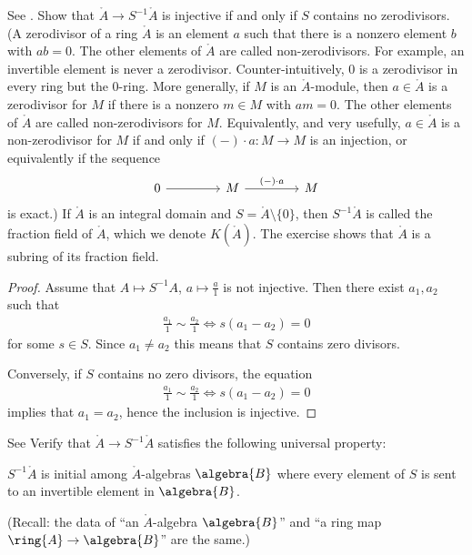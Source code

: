 \begin{exercise}
  See \cite[Exercise 1.3.C]{vakil2024the-rising-sea}.
  Show that $\ring{A}\rightarrow S^{-1}\ring{A}$ is injective if and only if $S$ contains no
  zerodivisors. (A zerodivisor of a ring $\ring{A}$ is an element $a$ such that
  there is a nonzero element $b$ with $ab = 0$. The other elements of $\ring{A}$
  are called non-zerodivisors. For example, an invertible element is
  never a zerodivisor. Counter-intuitively, $0$ is a zerodivisor in
  every ring but the $0$-ring. More generally, if $M$ is an $\ring{A}$-module, then
  $a\in \ring{A}$ is a zerodivisor for $M$ if there is a nonzero $m \in M$ with $am =
  0$. The other elements of $\ring{A}$ are called non-zerodivisors for
  $M$. Equivalently, and very usefully, $a\in \ring{A}$ is a non-zerodivisor for $M$
  if and only if $(-)\cdot a \colon M\rightarrow  M$ is an injection,
  or equivalently if the sequence
    \begin{equation}
      \begin{tikzcd}[nodes in empty cells, column sep= 1.5cm, row sep=1.5cm]
        0 \ar[r] & M \ar[r, "(-)\cdot a "] & M 
      \end{tikzcd}
    \end{equation}
  is exact.) If $\ring{A}$ is an integral
  domain and $S = \ring{A}\setminus \{0\}$, then $S^{-1}\ring{A}$ is called the fraction field of $\ring{A}$,
  which we denote $K(\ring{A})$. The exercise shows that $\ring{A}$ is
  a subring of its fraction field.
\end{exercise}

\begin{proof}
  Assume that $A\mapsto S^{-1}A$, $a \mapsto \frac{a}{1}$ is not
  injective. Then there exist $a_1,a_2$ such that
  \begin{align*}
    \frac{a_1}{1}\sim \frac{a_2}{1} \Leftrightarrow s(a_1 - a_2) = 0
  \end{align*}
  for some $s\in S$. Since $a_1 \neq a_2 $ this means that $S$
  contains zero divisors.

  Conversely, if $S$ contains no zero divisors, the equation
  \begin{align*}
    \frac{a_1}{1}\sim \frac{a_2}{1} \Leftrightarrow s(a_1 - a_2) = 0
  \end{align*}
  implies that $a_1=a_2$, hence the inclusion is injective.
\end{proof}

\begin{exercise}
  See \cite[Exercise 1.3.D.]{vakil2024the-rising-sea}
  Verify that $\ring{A}\rightarrow S^{-1}\ring{A}$ satisfies the
  following universal property:

  $S^{-1}\ring{A}$ is initial among $\ring{A}$-algebras $\algebra{B}$
  where every element of $S$ is sent to an invertible element in
  $\algebra{B}$.

  (Recall: the data of “an $\ring{A}$-algebra $\algebra{B}$” and “a
  ring map $\ring{A}\rightarrow \algebra{B}$” are the same.)
\end{exercise}


